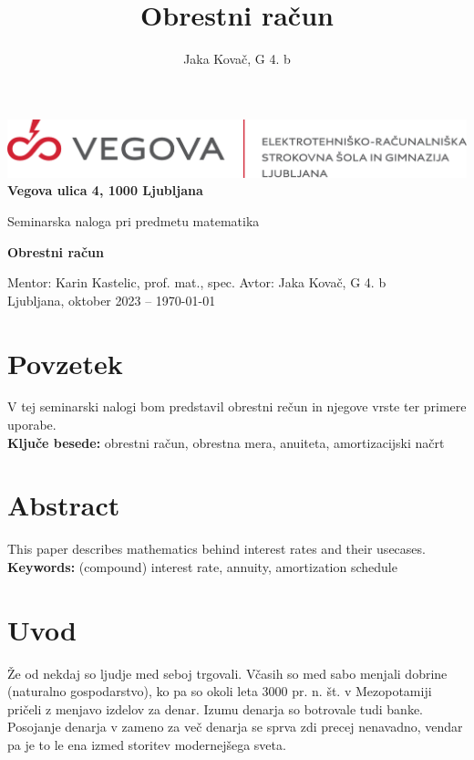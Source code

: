 \documentclass[12pt]{article}
\title{Obrestni račun}
\author{Jaka Kovač, G 4. b}
\begin{document}

\begin{center}
    \thispagestyle{empty}
    \includegraphics[scale=1]{slike/logotip_vegova_leze_brezokvirja.png}
    \\
    \textbf{Vegova ulica 4, 1000 Ljubljana}

    \vspace{\fill} 
    Seminarska naloga pri predmetu matematika

    \Huge{\textbf{Obrestni račun}}

    \normalsize
    \vspace{\fill}

    Mentor: Karin Kastelic, prof. mat., spec. \hfill Avtor: Jaka Kovač, G 4. b\\
    \null
    Ljubljana, oktober 2023 – \MMYYYYdate\today 
\end{center}
\newpage
\thispagestyle{empty}
\null
\newpage

\section*{Povzetek}
V tej seminarski nalogi bom predstavil obrestni rečun in njegove vrste ter primere uporabe.
\\ %
\textbf{Ključe besede:} obrestni račun, obrestna mera, anuiteta, amortizacijski načrt

\vfill
\section*{Abstract}
\foreignlanguage{english}{This paper describes mathematics behind interest rates and their
usecases.
\\ %
\textbf{Keywords:} (compound) interest rate, annuity, amortization schedule}
\vfill

\newpage
\thispagestyle{empty} %
\tableofcontents %
\listoftables    %

\newpage
\section{Uvod}
Že od nekdaj so ljudje med seboj trgovali. Včasih so med sabo menjali dobrine (naturalno 
gospodarstvo), ko pa so okoli leta 3000 pr. n. št. v Mezopotamiji \cite{wiki:money} pričeli
z menjavo izdelov za denar. Izumu denarja so botrovale tudi banke. Posojanje denarja v 
zameno za več denarja se sprva zdi precej nenavadno, vendar pa je to le ena izmed storitev
modernejšega sveta. 
\end{document}
